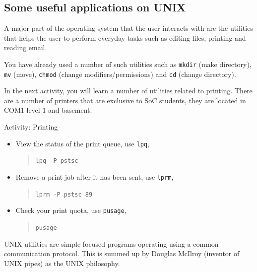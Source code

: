 \documentclass[a4paper]{beamer}
\newcommand{\cmd}[1]{\begin{quote}{\tt #1}\end{quote}}
\begin{document}
\subsection{Some useful applications on UNIX}
A major part of the operating system that the user interacts with are the
utilities that helps the user to perform everyday tasks such as editing files,
printing and reading email.     

You have already used a number of such utilities such as \texttt{mkdir} (make
directory), \texttt{mv} (move), \texttt{chmod} (change modifiers/permissions)
and \texttt{cd} (change directory).

In the next activity, you will learn a number of utilities related to printing.
There are a number of printers that are exclusive to SoC students, they are
located in COM1 level 1 and basement.  

\begin{frame}{Activity: Printing}

\begin{itemize}
\item View the status of the print queue, use \texttt{lpq}, \cmd{lpq -P pstsc}
\item Remove a print job after it has been sent, use \texttt{lprm}, \cmd{lprm -P pstsc 89}
\item Check your print quota, use \texttt{pusage}, \cmd{pusage}
\end{itemize}

\end{frame}

UNIX utilities are simple focused programs operating using a common
communication protocol. This is summed up by Douglas McIlroy (inventor of UNIX
pipes) as the UNIX philosophy.   
\end{document}
